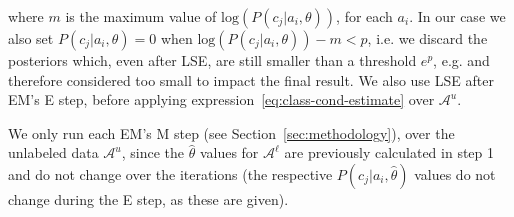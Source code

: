 where $m$ is the maximum value of $\text{log}(P(c_j|a_i,\theta))$, for each 
$a_i$. In our case we also set $P(c_j|a_i,\theta) = 0$ when 
$\text{log}(P(c_j|a_i,\theta)) - m < p$, i.e. we discard the posteriors which, 
even after LSE, are still smaller than a threshold 
$e^p$, e.g. and therefore considered too small to impact the final result. We 
also use LSE after EM's E step, before applying expression~\ref{eq:class-cond-estimate} 
over $\mathcal{A}^{u}$.\vertbreak

We only run each EM's M step (see Section~\ref{sec:methodology}), over the 
unlabeled data $\mathcal{A}^{u}$, since the 
$\hat{\theta}$ values for $\mathcal{A}^{\ell}$ are previously calculated in 
step 1 and do not change over the iterations (the respective 
$P(c_j|a_i,\hat{\theta})$ values do not change during the E step, as these 
are given).
